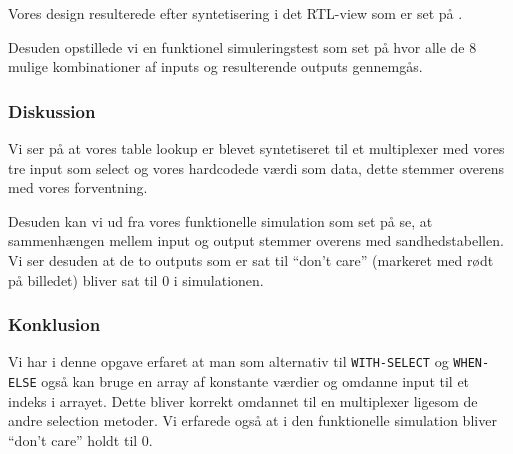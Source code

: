 {  Vores design resulterede efter syntetisering i det RTL-view som er set på .

  Desuden opstillede vi en funktionel simuleringstest som set på  hvor alle de 8 mulige kombinationer af inputs og resulterende outputs gennemgås.
  


  \subsubsection{Diskussion}

  Vi ser på  at vores table lookup er blevet syntetiseret til et multiplexer med vores tre input som select og vores hardcodede værdi som data, dette stemmer overens med vores forventning.
  
  Desuden kan vi ud fra vores funktionelle simulation som set på  se, at sammenhængen mellem input og output stemmer overens med sandhedstabellen. Vi ser desuden at de to outputs som er sat til ``don't care'' (markeret med rødt på billedet) bliver sat til 0 i simulationen.

  \subsubsection{Konklusion}

  Vi har i denne opgave erfaret at man som alternativ til \texttt{WITH-SELECT} og \texttt{WHEN-ELSE} også kan bruge en array af konstante værdier og omdanne input til et indeks i arrayet. Dette bliver korrekt omdannet til en multiplexer ligesom de andre selection metoder.
  Vi erfarede også at i den funktionelle simulation bliver ``don't care'' holdt til 0.
}